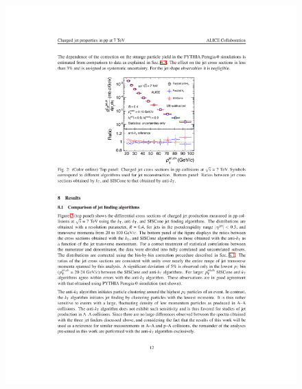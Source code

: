 \begin{figure}[hbtp]
\centering
{}
\includegraphics{Data_Analysis/Isolation/charged_jet_cross_section}

\end{figure}
